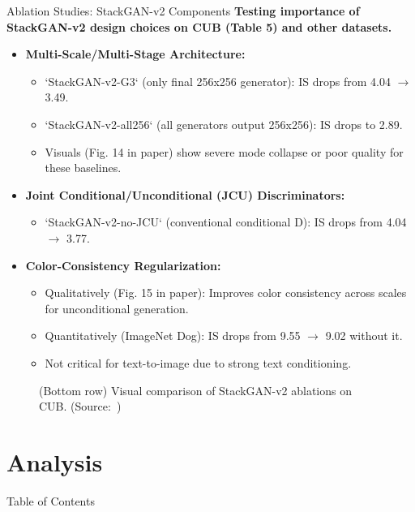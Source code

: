 \documentclass{beamer}
\newcommand{\paperfigure}[3][width=\textwidth]{%
    \begin{figure}%
        \centering%
        \caption{#3 (Source:~\cite{stackgan++})}%
        \label{fig:#2}%
    \end{figure}%
}
\begin{document}
\begin{frame}{Ablation Studies: StackGAN-v2 Components}
    \textbf{Testing importance of StackGAN-v2 design choices on CUB (Table 5) and other datasets.}
    \begin{itemize}
        \item \textbf{Multi-Scale/Multi-Stage Architecture:}
            \begin{itemize}
                \item `StackGAN-v2-G3` (only final 256x256 generator): IS drops from 4.04 $\rightarrow$ 3.49.
                \item `StackGAN-v2-all256` (all generators output 256x256): IS drops to 2.89.
                \item Visuals (Fig. 14 in paper) show severe mode collapse or poor quality for these baselines.
            \end{itemize}
        \item \textbf{Joint Conditional/Unconditional (JCU) Discriminators:}
            \begin{itemize}
                \item `StackGAN-v2-no-JCU` (conventional conditional D): IS drops from 4.04 $\rightarrow$ 3.77.
            \end{itemize}
        \item \textbf{Color-Consistency Regularization:}
            \begin{itemize}
                \item Qualitatively (Fig. 15 in paper): Improves color consistency across scales for unconditional generation.
                \item Quantitatively (ImageNet Dog): IS drops from 9.55 $\rightarrow$ 9.02 without it.
                \item Not critical for text-to-image due to strong text conditioning.
            \end{itemize}
    \end{itemize}
    \paperfigure[width=0.9\textwidth]{fig14_stackgan_v2_ablation_visuals}{(Bottom row) Visual comparison of StackGAN-v2 ablations on CUB.}
\end{frame}

\section{Analysis}
\begin{frame}{Table of Contents}
    \tableofcontents[currentsection]
\end{frame}
\end{document}
